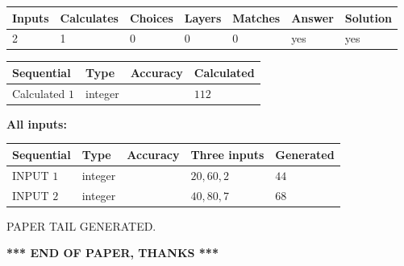 \documentclass[12pt]{article}
\begin{document}
 

 
   
   
   
   
\noindent\begin{tabular}{|l|l|l|l|l|l|l|}
 \hline
Inputs & Calculates & Choices & Layers & Matches & Answer & Solution \\ \hline
 2  & 
 1  & 
 0
  & 
 0  & 
 0  & 
  yes & 
  yes 
  \\ \hline
 \end{tabular}
   
   
   
   
\noindent{}
   
   
  
  
\noindent\begin{tabular}{|l|l|l|l|}
\hline
 Sequential & Type & Accuracy & Calculated \\ 
\hline
 
 
  Calculated $  1 $ & integer &  & 
  $ 112 $ 
 \\  \hline  
 \end{tabular}
   
   
   
   
\noindent\vspace{0.1in}\hspace{-0.08in} {\textbf{\Large{All inputs: }}}
   
   
  
  
\noindent\begin{tabular}{|l|l|l|l|l|}
\hline
 Sequential & Type & Accuracy & Three inputs & Generated \\ 
\hline
 
 
  INPUT $  1 $ & integer &  & $
 20
 , 
 60
 , 
 2
 $ & $ 44 $ 
 \\  \hline  
 
 
  INPUT $  2 $ & integer &  & $
 40
 , 
 80
 , 
 7
 $ & $ 68 $ 
 \\  \hline  
 \end{tabular}
   
   
   
   
   
   
 \vspace{0.2in}
 
   
   
\vspace{2.0in} PAPER TAIL GENERATED.
   
   
   
   
\vspace{1.0in} 
{\textbf{\large{ *** END OF PAPER, THANKS *** }}} 
   
\end{document}
